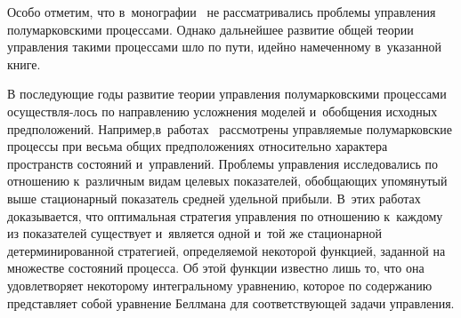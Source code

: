 \begin{multicols}{2}
Особо отметим, что в~монографии~\cite{9} не рас\-смат\-ри\-ва\-лись проблемы управления 
полумарковскими процессами. Однако дальнейшее развитие общей теории управления 
такими процессами шло по пути, идейно намеченному в~указанной книге.

В последующие годы развитие теории управ\-ле\-ния полумарковскими процессами 
осуществля-\linebreak лось по направлению усложнения моделей и~обобщения исходных предположений. 
Например,\linebreak в~работах~\cite{10, 11} рассмотрены управляемые по\-лумарковские процессы при 
весьма общих предположениях относительно характера пространств состояний и~управлений. 
Проблемы управления исследовались по отношению к~различным видам целевых показателей, 
обобщающих упомянутый выше стационарный показатель средней удельной прибыли. В~этих 
работах доказывается, что оптимальная стратегия управления по отношению к~каж\-до\-му из 
показателей существует и~является одной и~той же стационарной детерминированной 
стратегией, определяемой некоторой функцией, заданной на множестве со\-сто\-яний процесса. 
Об этой функции известно лишь то, что она удовлетворяет некоторому интегральному 
уравнению, которое по содержанию пред\-став\-ля\-ет собой уравнение Бел\-лма\-на для 
соответствующей задачи управ\-ления.


\end{multicols}
